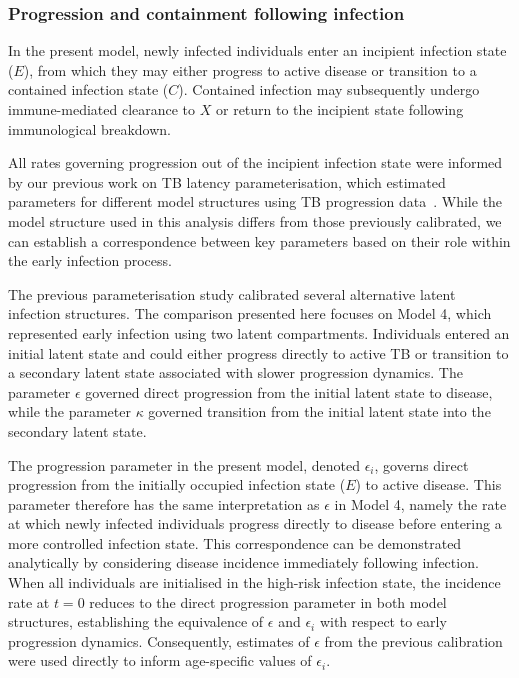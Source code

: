 \subsubsection{Progression and containment following infection}

In the present model, newly infected individuals enter an incipient infection state (\(E\)), from which they may either progress to active disease or transition to a contained infection state (\(C\)). Contained infection may subsequently undergo immune-mediated clearance to \(X\) or return to the incipient state following immunological breakdown.

All rates governing progression out of the incipient infection state were informed by our previous work on TB latency parameterisation, which estimated parameters for different model structures using TB progression data~\cite{ragonnet2017}. While the model structure used in this analysis differs from those previously calibrated, we can establish a correspondence between key parameters based on their role within the early infection process.

The previous parameterisation study calibrated several alternative latent infection structures. The comparison presented here focuses on Model 4, which represented early infection using two latent compartments. Individuals entered an initial latent state and could either progress directly to active TB or transition to a secondary latent state associated with slower progression dynamics. The parameter \(\epsilon\) governed direct progression from the initial latent state to disease, while the parameter \(\kappa\) governed transition from the initial latent state into the secondary latent state.

The progression parameter in the present model, denoted \(\epsilon_i\), governs direct progression from the initially occupied infection state (\(E\)) to active disease. This parameter therefore has the same interpretation as \(\epsilon\) in Model 4, namely the rate at which newly infected individuals progress directly to disease before entering a more controlled infection state. This correspondence can be demonstrated analytically by considering disease incidence immediately following infection. When all individuals are initialised in the high-risk infection state, the incidence rate at \(t = 0\) reduces to the direct progression parameter in both model structures, establishing the equivalence of \(\epsilon\) and \(\epsilon_i\) with respect to early progression dynamics. Consequently, estimates of \(\epsilon\) from the previous calibration were used directly to inform age-specific values of \(\epsilon_i\).

